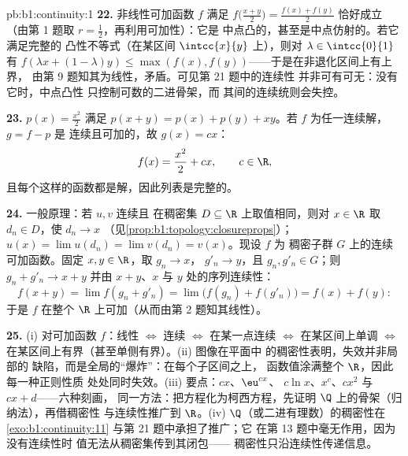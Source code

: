 \begin{solution}{pb:b1:continuity:1}
\textbf{22.} 非线性可加函数 $f$ 满足
$f\bigl(\frac{x+y}{2}\bigr) = \frac{f(x) + f(y)}{2}$ 恰好成立
（由第 1 题取 $r = \frac12$，再利用可加性）：它是
中点凸的，甚至是中点仿射的。若它满足完整的
凸性不等式（在某区间 $\intcc{x}{y}$ 上），则对
$\lambda \in \intcc{0}{1}$ 有 $f(\lambda x + (1-\lambda)y) \leq
\max(f(x), f(y))$——于是在非退化区间上有上界，
由第 9 题知其为线性，矛盾。可见第 21 题中的连续性
并非可有可无：没有它时，中点凸性
只控制可数的二进骨架，而
其间的连续统则会失控。

\textbf{23.} $p(x) = \frac{x^2}{2}$ 满足 $p(x+y) = p(x) +
p(y) + xy$。若 $f$ 为任一连续解，$g = f - p$ 是
连续且可加的，故 $g(x) = cx$：
\[
f(x) = \frac{x^2}{2} + cx , \qquad c \in \R ,
\]
且每个这样的函数都是解，因此列表是完整的。

\textbf{24.} 一般原理：若 $u, v$ 连续且
在稠密集 $D \subseteq \R$ 上取值相同，则对 $x \in \R$ 取
$d_n \in D$，使 $d_n \to x$
（见\cref{prop:b1:topology:closureprops}）；$u(x) = \lim u(d_n) =
\lim v(d_n) = v(x)$。现设 $f$ 为
稠密子群 $G$ 上的连续可加函数。固定 $x, y \in \R$，取 $g_n \to x$，
$g'_n \to y$，且 $g_n, g'_n \in G$；则 $g_n + g'_n \to x + y$
并由 $x + y$、$x$ 与 $y$ 处的序列连续性：
\[
f(x + y) = \lim f(g_n + g'_n) = \lim\bigl(f(g_n) +
f(g'_n)\bigr) = f(x) + f(y) :
\]
于是 $f$ 在整个 $\R$ 上可加（从而由第 2 题知其线性）。

\textbf{25.} (i) 对可加函数 $f$：线性 $\iff$ 连续
$\iff$ 在某一点连续 $\iff$ 在某区间上单调
$\iff$ 在某区间上有界（甚至单侧有界）。(ii) 图像在平面中
的稠密性表明，失效并非局部的
缺陷，而是全局的“爆炸”：在每个子区间之上，
函数值涂满整个 $\R$，因此每一种正则性质
处处同时失效。(iii) 要点：$cx$、$\eu^{cx}$、
$c\ln x$、$x^c$、$cx^2$ 与 $cx + d$——六种刻画，
同一方法：把方程化为柯西方程，先证明
$\Q$ 上的骨架（归纳法），再借稠密性
与连续性推广到 $\R$。(iv) $\Q$（或二进有理数）的稠密性在
\cref{exo:b1:continuity:11} 与第 21 题中承担了推广；它
在第 13 题中毫无作用，因为没有连续性时
值无法从稠密集传到其闭包——
稠密性只沿连续性传递信息。
\end{solution}
